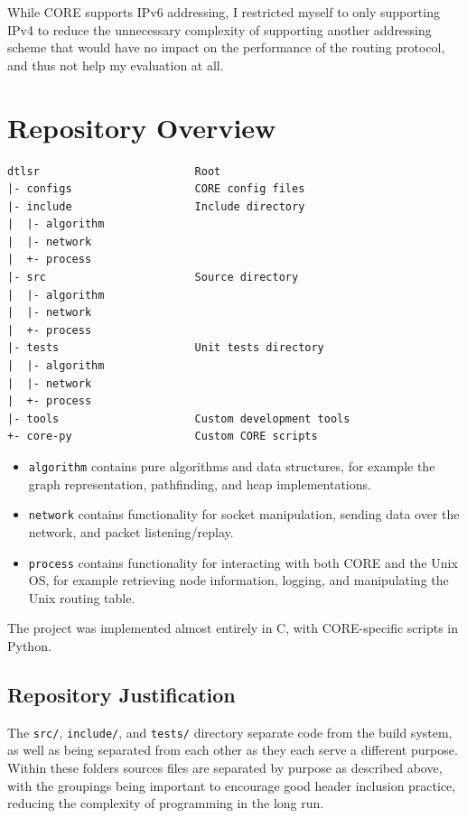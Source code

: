 \documentclass[withindex,glossary,openany]{cam-thesis}
\begin{document}
While CORE supports IPv6 addressing, I restricted myself to only supporting IPv4 to reduce the unnecessary complexity of supporting another addressing scheme that would have no impact on the performance of the routing protocol, and thus not help my evaluation at all.

\section{Repository Overview}

\begin{minipage}{1\textwidth} \centering
\begin{lstlisting}[label=repository, frame=tb]
dtlsr                        Root
|- configs                   CORE config files
|- include                   Include directory
|  |- algorithm
|  |- network
|  +- process
|- src                       Source directory
|  |- algorithm
|  |- network
|  +- process
|- tests                     Unit tests directory
|  |- algorithm
|  |- network
|  +- process
|- tools                     Custom development tools
+- core-py                   Custom CORE scripts
\end{lstlisting}
\end{minipage}

\begin{itemize}
	\item
	\texttt{algorithm} contains pure algorithms and data structures, for example the graph representation, pathfinding, and heap implementations.

	\item
	\texttt{network} contains functionality for socket manipulation, sending data over the network, and packet listening/replay.
	
	\item
	\texttt{process} contains functionality for interacting with both CORE and the Unix OS, for example retrieving node information, logging, and manipulating the Unix routing table.
\end{itemize}

The project was implemented almost entirely in C, with CORE-specific scripts in Python.

\subsection{Repository Justification}

The \texttt{src/}, \texttt{include/}, and \texttt{tests/} directory separate code from the build system, as well as being separated from each other as they each serve a different purpose. Within these folders sources files are separated by purpose as described above, with the groupings being important to encourage good header inclusion practice, reducing the complexity of programming in the long run.
\end{document}
